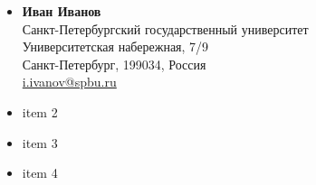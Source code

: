 \begin{multicols}{2}
\begin{itemize}
        \item \textbf{Иван Иванов} \\
              Санкт-Петербургский государственный университет \\
              Университетская набережная, 7/9 \\
              Санкт-Петербург, 199034, Россия \\
              \url{i.ivanov@spbu.ru}

              
        \item item 2
        \item item 3
        \item item 4
    \end{itemize}
\end{multicols}

\newpage